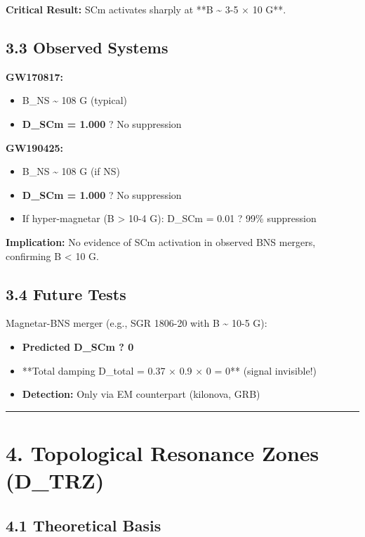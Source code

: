 \documentclass[11pt]{article}
\begin{document}
\textbf{Critical Result:} SCm activates sharply at **B \textasciitilde{} 3-5 $\times$ 10 G**.

\subsection*{3.3 Observed Systems}

\textbf{GW170817:}

\begin{itemize}
  \item B\_NS \textasciitilde{} 108 G (typical)
  \item \textbf{D\_SCm = 1.000} ? No suppression
\end{itemize}

\textbf{GW190425:}

\begin{itemize}
  \item B\_NS \textasciitilde{} 108 G (if NS)
  \item \textbf{D\_SCm = 1.000} ? No suppression
  \item If hyper-magnetar (B > 10-4 G): D\_SCm = 0.01 ? 99\% suppression
\end{itemize}

\textbf{Implication:} No evidence of SCm activation in observed BNS mergers, confirming B < 10 G.

\subsection*{3.4 Future Tests}

Magnetar-BNS merger (e.g., SGR 1806-20 with B \textasciitilde{} 10-5 G):

\begin{itemize}
  \item \textbf{Predicted D\_SCm ? 0}
  \item **Total damping D\_total = 0.37 $\times$ 0.9 $\times$ 0 = 0** (signal invisible!)
  \item \textbf{Detection:} Only via EM counterpart (kilonova, GRB)
\end{itemize}

\noindent\rule{\textwidth}{0.4pt}

\section*{4. Topological Resonance Zones (D\_TRZ)}

\subsection*{4.1 Theoretical Basis}
\end{document}
